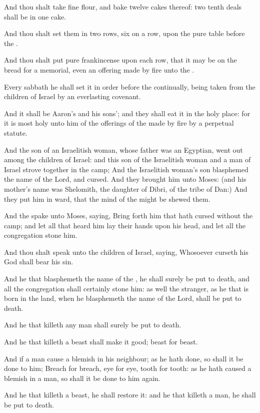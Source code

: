 \Verse And thou shalt take fine flour, and bake twelve cakes thereof: two tenth deals shall be in one cake.

\Verse And thou shalt set them in two rows, six on a row, upon the pure table before the \LORD.

\Verse And thou shalt put pure frankincense upon each row, that it may be on the bread for a memorial, even an offering made by fire unto the \LORD.

\Verse Every sabbath he shall set it in order before the \LORD continually, being taken from the children of Israel by an everlasting covenant.

\Verse And it shall be Aaron's and his sons'; and they shall eat it in the holy place: for it is most holy unto him of the offerings of the \LORD made by fire by a perpetual statute.

\Verse And the son of an Israelitish woman, whose father was an Egyptian, went out among the children of Israel: and this son of the Israelitish woman and a man of Israel strove together in the camp; \Verse And the Israelitish woman's son blasphemed the name of the Lord, and cursed. And they brought him unto Moses: (and his mother's name was Shelomith, the daughter of Dibri, of the tribe of Dan:) \Verse And they put him in ward, that the mind of the \LORD might be shewed them.

\Verse And the \LORD spake unto Moses, saying, \Verse Bring forth him that hath cursed without the camp; and let all that heard him lay their hands upon his head, and let all the congregation stone him.

\Verse And thou shalt speak unto the children of Israel, saying, Whosoever curseth his God shall bear his sin.

\Verse And he that blasphemeth the name of the \LORD, he shall surely be put to death, and all the congregation shall certainly stone him: as well the stranger, as he that is born in the land, when he blasphemeth the name of the Lord, shall be put to death.

\Verse And he that killeth any man shall surely be put to death.

\Verse And he that killeth a beast shall make it good; beast for beast.

\Verse And if a man cause a blemish in his neighbour; as he hath done, so shall it be done to him; \Verse Breach for breach, eye for eye, tooth for tooth: as he hath caused a blemish in a man, so shall it be done to him again.

\Verse And he that killeth a beast, he shall restore it: and he that killeth a man, he shall be put to death.

